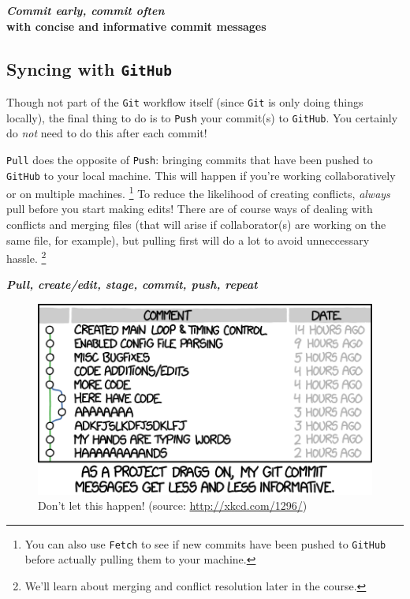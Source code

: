 \documentclass[12pt,letterpaper]{article}
\begin{document}
\begin{tcolorbox}[breakable, enhanced, before upper={\parindent15pt}]
\begin{center}
\textbf{\emph{Commit early, commit often}\\
		with concise and informative commit messages}
\end{center}
\end{tcolorbox}


\subsection{Syncing with \texttt{GitHub}}

Though not part of the \texttt{Git} workflow itself
(since \texttt{Git} is only doing things locally),
the final thing to do is to \texttt{Push} 
your commit(s) to \texttt{GitHub}.
You certainly do \textit{not} need to do this after each commit!

\texttt{Pull} does the opposite of \texttt{Push}: 
bringing commits that have been pushed to \texttt{GitHub}
to your local machine.
This will happen if you're working collaboratively or on multiple machines.
\unskip
\footnote{You can also use \texttt{Fetch} to see if new commits have been pushed to \texttt{GitHub} before actually pulling them to your machine.}
To reduce the likelihood of creating conflicts,
\emph{always} pull before you start making edits!
There are of course ways of dealing with conflicts and merging files
(that will arise if collaborator(s) are working on the same file, for example), 
but pulling first will do a lot to avoid unneccessary hassle.
\unskip
\footnote{We'll learn about merging and conflict resolution later in the course.}

\begin{tcolorbox}[breakable, enhanced, before upper={\parindent15pt}]
		\begin{center}
			\textbf{\emph{Pull, create/edit, stage, commit, push, repeat}}
		\end{center}
\end{tcolorbox}

\begin{figure}[!h]
	\centering
	\includegraphics[width=0.7\linewidth]{figs/xkcd_git_commit}
	\caption{Don't let this happen!  (source: \url{http://xkcd.com/1296/})}
	\label{fig:commit_messages}
\end{figure}

\clearpage


\end{document}
